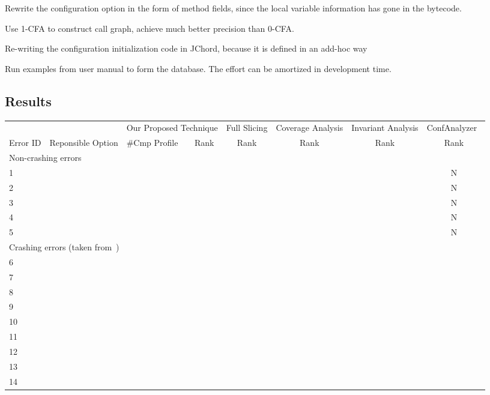 Rewrite the configuration option in the form of method fields, since
the local variable information has gone in the bytecode.

Use 1-CFA to construct call graph, achieve much better precision
than 0-CFA. 

Re-writing the configuration initialization code in JChord, because
it is defined in an add-hoc way

Run examples from user manual to form the database. The effort
can be amortized in development time.

\subsection{Results}

\begin{table*}[t]
\setlength{\tabcolsep}{.54\tabcolsep}
\begin{tabular}{|l||l||l|l||c||c||c||c|}
\hline
  & & \multicolumn{2}{|c||}{Our Proposed Technique} & Full Slicing & Coverage Analysis& Invariant Analysis & ConfAnalyzer~\cite{}\\
\cline{3-8}
 Error ID & Reponsible Option & \#Cmp Profile & Rank  & Rank & Rank & Rank & Rank \\
 \hline
\hline
\multicolumn{8}{|l|}{Non-crashing errors}   \\
 \hline
 1 & & & & & & &N \\
 2 & & & & & & &N\\
 3 & & & & & & &N\\
 4 & & & & & & &N\\
 5 & & & & & & &N\\
\hline
\hline
\multicolumn{8}{|l|}{Crashing errors (taken from~\cite{})}   \\
\hline
 6 & & & & & & &\\
 7 & & & & & & &\\
 8 & & & & & & &\\
 9 & & & & & & &\\
 10 & & & & & & &\\
 11 & & & & & & &\\
 12 & & & & & & &\\
 13 & & & & & & &\\
 14 & & & & & & &\\
\hline
\end{tabular}

\end{table*}



